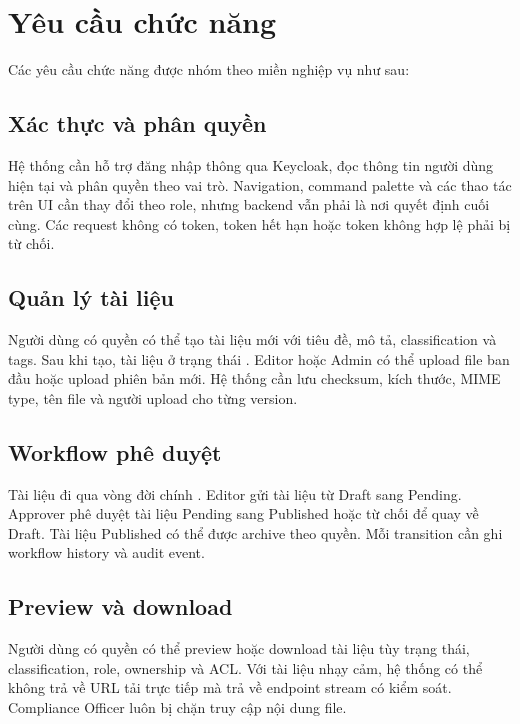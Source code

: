 \section{Yêu cầu chức năng}

Các yêu cầu chức năng được nhóm theo miền nghiệp vụ như sau:

\subsection{Xác thực và phân quyền}

Hệ thống cần hỗ trợ đăng nhập thông qua Keycloak, đọc thông tin người dùng hiện tại và phân quyền theo vai trò. Navigation, command palette và các thao tác trên UI cần thay đổi theo role, nhưng backend vẫn phải là nơi quyết định cuối cùng. Các request không có token, token hết hạn hoặc token không hợp lệ phải bị từ chối.

\subsection{Quản lý tài liệu}

Người dùng có quyền có thể tạo tài liệu mới với tiêu đề, mô tả, classification và tags. Sau khi tạo, tài liệu ở trạng thái . Editor hoặc Admin có thể upload file ban đầu hoặc upload phiên bản mới. Hệ thống cần lưu checksum, kích thước, MIME type, tên file và người upload cho từng version.

\subsection{Workflow phê duyệt}

Tài liệu đi qua vòng đời chính . Editor gửi tài liệu từ Draft sang Pending. Approver phê duyệt tài liệu Pending sang Published hoặc từ chối để quay về Draft. Tài liệu Published có thể được archive theo quyền. Mỗi transition cần ghi workflow history và audit event.

\subsection{Preview và download}

Người dùng có quyền có thể preview hoặc download tài liệu tùy trạng thái, classification, role, ownership và ACL. Với tài liệu nhạy cảm, hệ thống có thể không trả về URL tải trực tiếp mà trả về endpoint stream có kiểm soát. Compliance Officer luôn bị chặn truy cập nội dung file.

